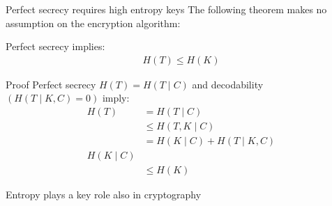 \begin{parag}{Perfect secrecy requires high entropy keys}
    The following theorem makes no assumption on the encryption algorithm:
    \begin{center}
        
        
    \end{center}
    
    \begin{theoreme}
        Perfect secrecy implies:
        \begin{align*}
            H(T) \leq H(K)
        \end{align*}
        
    \end{theoreme}
   \begin{subparag}{Proof}
       Perfect secrecy $H(T) = H(T \mid  C)$ and decodability $(H(T \mid  K, C) = 0)$ imply:
       \begin{align*}
           H(T) &= H(T \mid  C)\\
                &\leq H(T, K \mid C)\\
                &= H(K \mid  C) + H(T \mid  K, C)\\
                H(K \mid  C)\\
                &\leq H(K)
       \end{align*}
   \end{subparag}
   \begin{framedremark}
       Entropy plays a key role also in cryptography
   \end{framedremark}
   
\end{parag}

